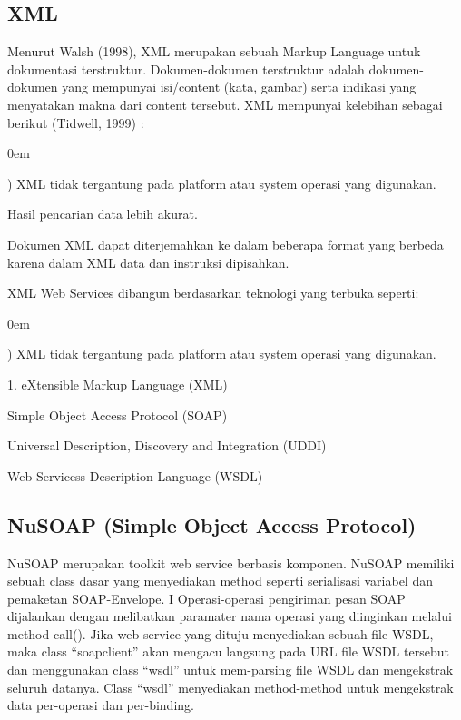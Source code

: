 \documentclass{jtetiproposalskripsi}
\begin{document}
\subsection{XML}
Menurut Walsh (1998), XML merupakan   sebuah Markup Language untuk dokumentasi terstruktur. Dokumen-dokumen terstruktur adalah dokumen-dokumen yang mempunyai isi/content (kata, gambar) serta indikasi yang menyatakan makna dari content tersebut. XML mempunyai kelebihan sebagai berikut (Tidwell, 1999) :  
\vspace{-0.5cm}

\begin{enumerate}[a.]
\begin{singlespace}
\itemsep0em
\item )  XML tidak tergantung pada platform atau system operasi yang digunakan. 
\item Hasil pencarian data lebih akurat.
\item Dokumen XML dapat diterjemahkan ke dalam beberapa format yang berbeda karena dalam XML data    dan instruksi dipisahkan. 
\end{singlespace}
\end{enumerate}

XML Web Services dibangun berdasarkan teknologi yang terbuka seperti:
\vspace{-0.5cm}

\begin{enumerate}[a.]
\begin{singlespace}
\itemsep0em
\item )  XML tidak tergantung pada platform atau system operasi yang digunakan. 
\item 1.	eXtensible Markup Language (XML)
\item Simple Object Access Protocol  (SOAP)
\item Universal Description, Discovery and Integration (UDDI) 
\item Web Servicess Description Language (WSDL)    
\end{singlespace}
\end{enumerate} 

\subsection{NuSOAP (Simple Object Access Protocol)}
NuSOAP merupakan toolkit web service berbasis komponen. NuSOAP memiliki sebuah class dasar yang menyediakan method seperti serialisasi variabel dan pemaketan SOAP-Envelope. I
Operasi-operasi pengiriman pesan SOAP dijalankan dengan melibatkan paramater nama operasi yang diinginkan melalui method call(). Jika web service yang dituju menyediakan  sebuah file WSDL, maka class “soapclient” akan mengacu langsung pada URL file WSDL tersebut dan menggunakan class “wsdl” untuk mem-parsing file WSDL dan mengekstrak seluruh datanya. Class “wsdl” menyediakan method-method untuk mengekstrak data per-operasi dan per-binding.
\end{document}
